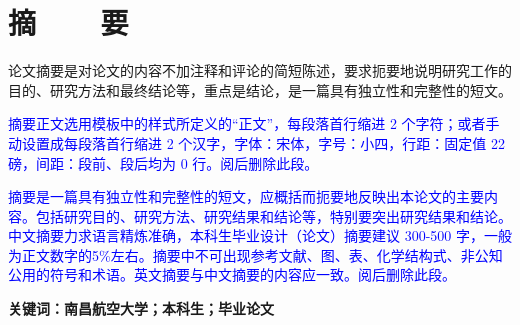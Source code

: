 %
%
%
%


\vspace*{-11mm}

\begin{center}
  \heiti{}\textbf{\thesisTitle}
\end{center}

\vspace*{2mm}

{\let\clearpage\relax \chapter*{\textmd{摘~~~~要}}}
\setcounter{page}{1}

\vspace*{1mm}

\setlength{\parskip}{0em}

论文摘要是对论文的内容不加注释和评论的简短陈述，要求扼要地说明研究工作的目的、研究方法和最终结论等，重点是结论，是一篇具有独立性和完整性的短文。

\textcolor{blue}{摘要正文选用模板中的样式所定义的“正文”，每段落首行缩进 2 个字符；或者手动设置成每段落首行缩进 2 个汉字，字体：宋体，字号：小四，行距：固定值 22 磅，间距：段前、段后均为 0 行。阅后删除此段。}

\textcolor{blue}{摘要是一篇具有独立性和完整性的短文，应概括而扼要地反映出本论文的主要内容。包括研究目的、研究方法、研究结果和结论等，特别要突出研究结果和结论。中文摘要力求语言精炼准确，本科生毕业设计（论文）摘要建议 300-500 字，一般为正文数字的5\%左右。摘要中不可出现参考文献、图、表、化学结构式、非公知公用的符号和术语。英文摘要与中文摘要的内容应一致。阅后删除此段。}

\vspace{4ex}\noindent\textbf{\heiti 关键词：南昌航空大学；本科生；毕业论文}
\newpage

\vspace*{-2mm}

\begin{spacing}{0.95}
  \centering
  \heiti{}\textbf{\thesisTitleEN}
\end{spacing}

\vspace*{17mm}

